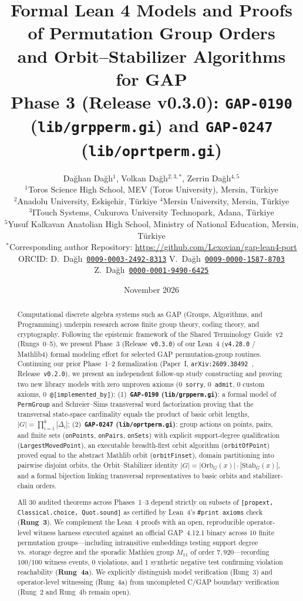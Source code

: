 \documentclass[11pt,a4paper]{article}
\title{\textbf{Formal Lean 4 Models and Proofs of Permutation Group Orders\\and Orbit--Stabilizer Algorithms for GAP}\\[0.3em]
\large Phase 3 (Release v0.3.0): \texttt{GAP-0190} (\texttt{lib/grpperm.gi}) and \texttt{GAP-0247} (\texttt{lib/oprtperm.gi})}
\author{
  Da\u{g}han Da\u{g}l\i$^{1}$,\quad
  Volkan Da\u{g}l\i$^{2,3,*}$,\quad
  Zerrin Da\u{g}l\i$^{4,5}$\\[0.6em]
  \footnotesize $^{1}$Toros Science High School, MEV (Toros University), Mersin, T\"{u}rkiye\\
  \footnotesize $^{2}$Anadolu University, Eski\c{s}ehir, T\"{u}rkiye \;\textbullet\; $^{4}$Mersin University, Mersin, T\"{u}rkiye\\
  \footnotesize $^{3}$ITouch Systems, Cukurova University Technopark, Adana, T\"{u}rkiye\\
  \footnotesize $^{5}$Yusuf Kalkavan Anatolian High School, Ministry of National Education, Mersin, T\"{u}rkiye\\
  \footnotesize $^{*}$Corresponding author \;\textbullet\; Repository: \url{https://github.com/Lexovian/gap-lean4-port}\\
  \scriptsize ORCID: D.~Da\u{g}l\i~\href{https://orcid.org/0009-0003-2492-8313}{\texttt{0009-0003-2492-8313}} \;\textbullet\; V.~Da\u{g}l\i~\href{https://orcid.org/0009-0000-1587-8703}{\texttt{0009-0000-1587-8703}} \;\textbullet\; Z.~Da\u{g}l\i~\href{https://orcid.org/0000-0001-9490-6425}{\texttt{0000-0001-9490-6425}}
}
\date{November 2026}
\begin{document}
\maketitle

\begin{abstract}
Computational discrete algebra systems such as GAP (Groups, Algorithms, and Programming) underpin research across finite group theory, coding theory, and cryptography. Following the epistemic framework of the Shared Terminology Guide~v2 (Rungs~0--5), we present Phase~3 (Release~\texttt{v0.3.0}) of our Lean~4 (\texttt{v4.28.0} / Mathlib4) formal modeling effort for selected GAP permutation-group routines. Continuing our prior Phase~1--2 formalization (Paper~I, \texttt{arXiv:2609.38492}~\cite{dagli_2026_gap_lean4_arxiv,dagli_2026_gap_lean4_zenodo_v020}, Release~\texttt{v0.2.0}), we present an independent follow-up study constructing and proving two new library models with zero unproven axioms ($0$~\texttt{sorry}, $0$~\texttt{admit}, $0$ custom axioms, $0$~\texttt{@[implemented\_by]}):
(1)~\textbf{\texttt{GAP-0190} (\texttt{lib/grpperm.gi})}: a formal model of \texttt{PermGroup} and Schreier--Sims transversal word factorization proving that the transversal state-space cardinality equals the product of basic orbit lengths, $|G| = \prod_{i=1}^k |\Delta_i|$;
(2)~\textbf{\texttt{GAP-0247} (\texttt{lib/oprtperm.gi})}: group actions on points, pairs, and finite sets (\texttt{onPoints}, \texttt{onPairs}, \texttt{onSets}) with explicit support-degree qualification (\texttt{LargestMovedPoint}), an executable breadth-first orbit algorithm (\texttt{orbitOfPoint}) proved equal to the abstract Mathlib orbit (\texttt{orbitFinset}), domain partitioning into pairwise disjoint orbits, the Orbit--Stabilizer identity $|G| = |\mathrm{Orb}_G(x)| \cdot |\mathrm{Stab}_G(x)|$, and a formal bijection linking transversal representatives to basic orbits and stabilizer-chain orders.

All $30$ audited theorems across Phases~1--3 depend strictly on subsets of \texttt{[propext, Classical.choice, Quot.sound]} as certified by Lean~4's \texttt{\#print axioms} check (\textbf{Rung~3}). We complement the Lean~4 proofs with an open, reproducible operator-level witness harness executed against an official GAP~4.12.1 binary across $10$ finite permutation groups—including intransitive embeddings testing support degree vs.\ storage degree and the sporadic Mathieu group $M_{11}$ of order $7{,}920$—recording $100/100$ witness events, $0$ violations, and $1$ synthetic negative test confirming violation reachability (\textbf{Rung~4a}). We explicitly distinguish model verification (Rung~3) and operator-level witnessing (Rung~4a) from uncompleted C/GAP boundary verification (Rung~2 and Rung~4b remain open).
\end{abstract}
\end{document}
